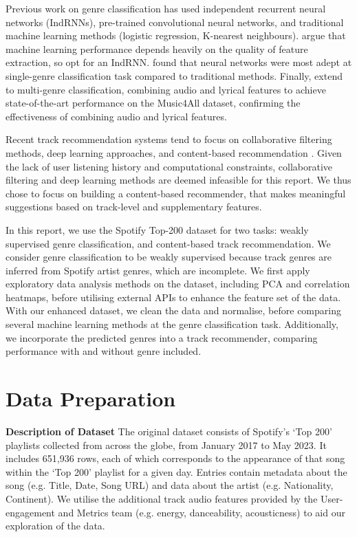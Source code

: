 \documentclass{article}
\newcommand{\minisection}[1]{\textbf{#1}\quad}
\begin{document}
Previous work on genre classification has used independent recurrent neural networks (IndRNNs), pre-trained convolutional neural networks, and traditional machine learning methods (logistic regression, K-nearest neighbours). \citet{wu2018music} argue that machine learning performance depends heavily on the quality of feature extraction, so opt for an IndRNN. \citet{kumar2016comparative} found that neural networks were most adept at single-genre classification task compared to traditional methods. Finally, \citet{ru2023improving} extend to multi-genre classification, combining audio and lyrical features to achieve state-of-the-art performance on the Music4All dataset, confirming the effectiveness of combining audio and lyrical features. 

Recent track recommendation systems tend to focus on collaborative filtering methods, deep learning approaches, and content-based recommendation \citep{7910613, schedl2019deep, soleymani2015content}. Given the lack of user listening history and computational constraints, collaborative filtering and deep learning methods are deemed infeasible for this report. We thus chose to focus on building a content-based recommender, that makes meaningful suggestions based on track-level and supplementary features.

In this report, we use the Spotify Top-200 dataset for two tasks: weakly supervised genre classification, and content-based track recommendation. We consider genre classification to be weakly supervised because track genres are inferred from Spotify artist genres, which are incomplete. We first apply exploratory data analysis methods on the dataset, including PCA and correlation heatmaps, before utilising external APIs to enhance the feature set of the data. With our enhanced dataset, we clean the data and normalise, before comparing several machine learning methods at the genre classification task. Additionally, we incorporate the predicted genres into a track recommender, comparing performance with and without genre included.

\vspace{-3mm}
\section{Data Preparation}
\vspace{-3mm}
\minisection{Description of Dataset} The original dataset consists of Spotify's `Top 200' playlists collected from across the globe, from January 2017 to May 2023. It includes 651,936 rows, each of which corresponds to the appearance of that song within the `Top 200' playlist for a given day. Entries contain metadata about the song (e.g. Title, Date, Song URL) and data about the artist (e.g. Nationality, Continent). We utilise the additional track audio features provided by the User-engagement and Metrics team (e.g. energy, danceability, acousticness) to aid our exploration of the data.
\end{document}

